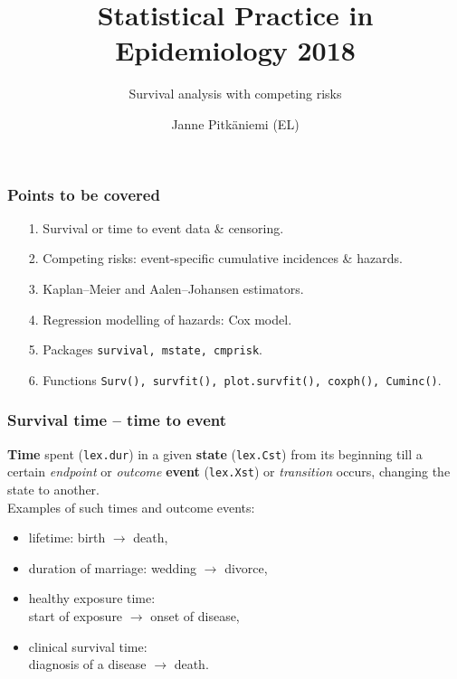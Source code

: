 \documentclass[handout,12pt,dvipsnames,t]{beamer}
\title{Statistical Practice in Epidemiology 2018}
\subtitle{Survival analysis with competing risks} %
\author{Janne Pitk\"aniemi (EL) }
\date{}
\begin{document}
\maketitle


\begin{frame}[fragile]
\frametitle{Points to be covered}

\begin{itemize}
\item[1.] Survival or time to event data \& censoring.
 \medskip
 \item[2.] 
 Competing risks: event-specific cumulative incidences \& hazards.
 \medskip
\item[3.] Kaplan--Meier and Aalen--Johansen estimators.
 \medskip
 \item[4.] 
 Regression modelling of hazards: Cox model.
 \medskip
 \item[5.]
 Packages \texttt{survival, mstate, cmprisk}.
\medskip
\item[6.] 
 Functions \texttt{Surv(), survfit(), plot.survfit(), coxph(), Cuminc()}.
\end{itemize}

\end{frame}


\begin{frame}[fragile]
\frametitle{Survival time -- time to event}

\textbf{Time} spent (\texttt{lex.dur}) in a given \textbf{state} (\texttt{lex.Cst}) from its 
beginning till a certain \textit{endpoint} or \textit{outcome} \textbf{event}  (\texttt{lex.Xst}) or \textit{transition}  occurs, changing the state to another. \\
 

\bigskip
Examples of such times and outcome events:
\begin{itemize}
\item lifetime: birth $\rightarrow$ death,
\medskip
\item duration of marriage: wedding $\to$ divorce, 
\medskip
\item healthy exposure time: \\ start of exposure  
  $\rightarrow$ onset of disease,
  \medskip
\item clinical survival time: \\
 diagnosis of a disease  $\rightarrow$ death.
\end{itemize}


\end{frame}
\end{document}
